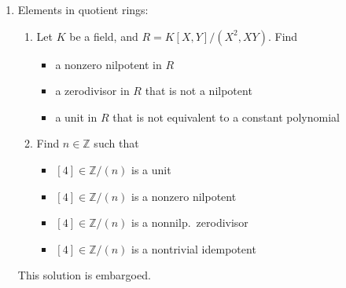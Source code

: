 \documentclass[12pt]{amsart}
\newcommand{\Z}{\mathbb{Z}}
\newcommand{\solutione}[1]{\ifthenelse {\equal{\displaysol}{1}} {\begin{framed}{\color{leaf}This solution is embargoed.}\end{framed}} { \ }}
\newcommand\itemB{\stepcounter{enumi}\item[(\theenumi)]}
\begin{document}
\begin{enumerate}
\itemB Elements in quotient rings:
\begin{enumerate}
\item Let $K$ be a field, and $R=K[X,Y]/(X^2,XY)$. Find
\begin{itemize}
\item a nonzero nilpotent in $R$
\item a zerodivisor in $R$ that is not a nilpotent
\item a unit in $R$ that is not equivalent to a constant polynomial
\end{itemize}
\item Find $n\in \Z$ such that
\vspace{-4mm}
\begin{multicols}{2}
\begin{itemize}
\item $[4] \in \Z/(n)$ is a unit
\item $[4] \in \Z/(n)$ is a nonzero nilpotent
\item $[4] \in \Z/(n)$ is a nonnilp.~zerodivisor
\item $[4] \in \Z/(n)$ is a nontrivial idempotent
\end{itemize}
\end{multicols}
\end{enumerate}

\solutione{\begin{enumerate}
\item 
\begin{itemize}
\item $[X]$ is nilpotent, since $[X^2] = [0]$. $[X]\neq 0$ since any element of $(X^2,XY)$ has top degree at least 2.
\item $[Y]$ is a zerodivisor, since $[X][Y]=[XY]=[0]$, and we already checked that $[X]\neq 0$. $[Y]$ is not nilpotent, since, thinking of $K[X,Y]$ as $K[X][Y]$ and considering $X$-degrees only, any element of $(X^2,XY)$ has degree at least $1$, so $[Y^n]\notin (X^2,XY)$ for any $n$.
\item $[1+X]$ is a unit since $[1-X][1+X] = [1-X^2] = [1]$. It is not equivalent to a constant since $[1+X]=[\lambda]$ implies $(1-\lambda) + X\in (X^2,XY)$, which is impossible for degree reasons again.
\end{itemize}
\item \begin{multicols}{2}
\begin{itemize}
\item $n=3$ or any odd number
\item $n=8$ or any larger power of $2$
\item $n=6$ or number with $2$ and an odd prime as a factor
\item $n=12$ or any multiple of $12$
\end{itemize}
\end{multicols}
\end{enumerate}}




\end{enumerate}
\end{document}
